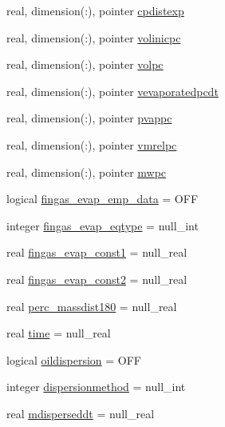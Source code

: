\begin{DoxyCompactItemize}
real, dimension(\+:), pointer \mbox{\hyperlink{structmoduleoil_1_1t__var_a61eac1cd443dbe6680a6e467e57c09f1}{cpdistexp}}
\item 
real, dimension(\+:), pointer \mbox{\hyperlink{structmoduleoil_1_1t__var_a91381f513ca0a2d9f3198297df8d0d5e}{volinicpc}}
\item 
real, dimension(\+:), pointer \mbox{\hyperlink{structmoduleoil_1_1t__var_a1945081f9bc61fa5b2c755cb86881bc2}{volpc}}
\item 
real, dimension(\+:), pointer \mbox{\hyperlink{structmoduleoil_1_1t__var_a53f1c332ed75fa2f4830d066978bb024}{vevaporatedpcdt}}
\item 
real, dimension(\+:), pointer \mbox{\hyperlink{structmoduleoil_1_1t__var_aea683790a9cc6cc4c6f4e05e547051de}{pvappc}}
\item 
real, dimension(\+:), pointer \mbox{\hyperlink{structmoduleoil_1_1t__var_a096f02c90923f5f64a00f427040ca793}{vmrelpc}}
\item 
real, dimension(\+:), pointer \mbox{\hyperlink{structmoduleoil_1_1t__var_a9a99a98144c85afb87ef0cebfca0125b}{mwpc}}
\item 
logical \mbox{\hyperlink{structmoduleoil_1_1t__var_a40272315f05c78b7502e6294e4fce0a8}{fingas\+\_\+evap\+\_\+emp\+\_\+data}} = O\+FF
\item 
integer \mbox{\hyperlink{structmoduleoil_1_1t__var_acef33a8fb7b5dd56601dc127b5ea341b}{fingas\+\_\+evap\+\_\+eqtype}} = null\+\_\+int
\item 
real \mbox{\hyperlink{structmoduleoil_1_1t__var_af31cd38889404dba282040475e1d88ea}{fingas\+\_\+evap\+\_\+const1}} = null\+\_\+real
\item 
real \mbox{\hyperlink{structmoduleoil_1_1t__var_a6fc6f707fbbde0247842a16793cd3274}{fingas\+\_\+evap\+\_\+const2}} = null\+\_\+real
\item 
real \mbox{\hyperlink{structmoduleoil_1_1t__var_ade99f13f8f338bee052c1b638c0cf9b9}{perc\+\_\+massdist180}} = null\+\_\+real
\item 
real \mbox{\hyperlink{structmoduleoil_1_1t__var_a075ac4108875e59497b00df95b9a4c98}{time}} = null\+\_\+real
\item 
logical \mbox{\hyperlink{structmoduleoil_1_1t__var_a4a4657a8162eb34b334f51f8bd7937e9}{oildispersion}} = O\+FF
\item 
integer \mbox{\hyperlink{structmoduleoil_1_1t__var_a4d821408b1088eac6221767e454fe669}{dispersionmethod}} = null\+\_\+int
\item 
real \mbox{\hyperlink{structmoduleoil_1_1t__var_a4f95e9080c3f51932114ab49cc13e7e5}{mdisperseddt}} = null\+\_\+real

\end{DoxyCompactItemize}
